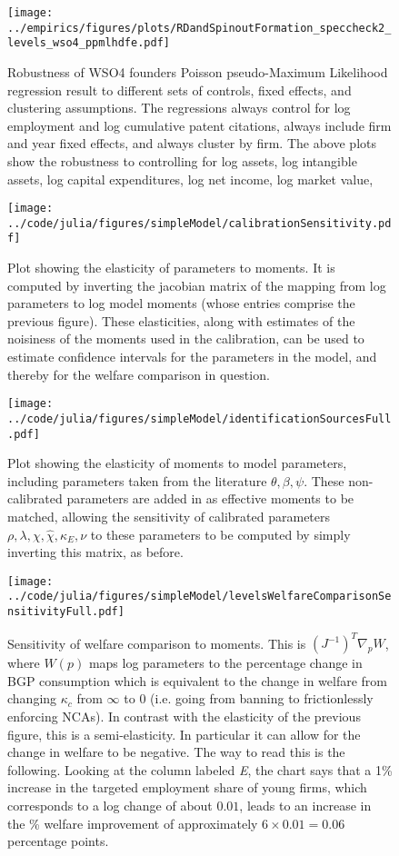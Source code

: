 \documentclass[11pt,english]{article}
\begin{document}
\begin{figure}[!htb]
	\centering
	\texttt{[image: ../empirics/figures/plots/RDandSpinoutFormation\_speccheck2\_levels\_wso4\_ppmlhdfe.pdf]}
	\caption{Robustness of WSO4 founders Poisson pseudo-Maximum Likelihood regression result to different sets of controls, fixed effects, and clustering assumptions. The regressions always control for log employment and log cumulative patent citations, always include firm and year fixed effects, and always cluster by firm. The above plots show the robustness to controlling for log assets, log intangible assets, log capital expenditures, log net income, log market value, }
	\label{figure:speccheck2_levels_wso4_ppmlhdfe}
\end{figure}

\begin{figure}[]
	\texttt{[image: ../code/julia/figures/simpleModel/calibrationSensitivity.pdf]}
	\caption{Plot showing the elasticity of parameters to moments. It is computed by inverting the jacobian matrix of the mapping from log parameters to log model moments (whose entries comprise the previous figure). These elasticities, along with estimates of the noisiness of the moments used in the calibration, can be used to estimate confidence intervals for the parameters in the model, and thereby for the welfare comparison in question.}
	\label{calibration_sensitivity}
\end{figure}

\begin{figure}[]
	\texttt{[image: ../code/julia/figures/simpleModel/identificationSourcesFull.pdf]}
	\caption{Plot showing the elasticity of moments to model parameters, including parameters taken from the literature $\theta , \beta, \psi$. These non-calibrated parameters are added in as effective moments to be matched, allowing the sensitivity of calibrated parameters $\rho, \lambda, \chi, \hat{\chi}, \kappa_E, \nu$ to these parameters to be computed by simply inverting this matrix, as before.}
	\label{calibration_identificationSources_full}
\end{figure}

\begin{figure}[!htb]
	\texttt{[image: ../code/julia/figures/simpleModel/levelsWelfareComparisonSensitivityFull.pdf]}
	\caption{Sensitivity of welfare comparison to moments. This is $(J^{-1})^T \nabla_p W$, where $W(p)$ maps log parameters to the percentage change in BGP consumption which is equivalent to the change in welfare from changing $\kappa_c$ from $\infty$ to $0$ (i.e. going from banning to frictionlessly enforcing NCAs). In contrast with the elasticity of the previous figure, this is a semi-elasticity. In particular it can allow for the change in welfare to be negative. The way to read this is the following. Looking at the column labeled \textit{E}, the chart says that a 1\% increase in the targeted employment share of young firms, which corresponds to a log change of about $0.01$, leads to an increase in the \% welfare improvement of approximately $6 \times 0.01 = 0.06$ percentage points.}
	\label{levelsWelfareComparisonSensitivityFull}
\end{figure}
\end{document}
